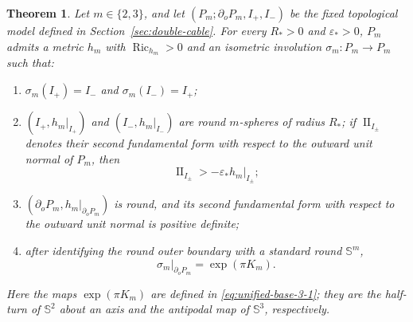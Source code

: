 \documentclass[11pt,reqno]{amsart}
\newtheorem{theorem}{Theorem}[section]
\theoremstyle{definition}
\numberwithin{equation}{section}
\DeclareMathOperator{\Ric}{Ric}
\DeclareMathOperator{\II}{II}
\begin{document}
\begin{theorem}
\label{thm:unified-directed-base}
Let $m\in\{2,3\}$, and let
$(P_m;\partial_oP_m,I_+,I_-)$ be the fixed topological model defined in
Section~\ref{sec:double-cable}.  For every $R_*>0$ and
$\varepsilon_*>0$, $P_m$ admits a metric $h_m$ with
$\Ric_{h_m}>0$ and an isometric
involution $\sigma_m:P_m\to P_m$ such that:
\begin{enumerate}[label=\textup{(\roman*)}]
\item $\sigma_m(I_+)=I_-$ and $\sigma_m(I_-)=I_+$;
\item $(I_+,h_m|_{I_+})$ and $(I_-,h_m|_{I_-})$ are round
$m$-spheres of radius $R_*$; if $\II_{I_\pm}$ denotes their second
fundamental form with respect to the outward unit normal of $P_m$, then
\begin{equation}
\II_{I_\pm}>-\varepsilon_*h_m|_{I_\pm};     \label{eq:unified-base-3-73}
\end{equation}
\item $(\partial_oP_m,h_m|_{\partial_oP_m})$ is round, and its second
fundamental form with respect to the outward unit normal is positive
definite;
\item after identifying the round outer boundary with a standard round
$\mathbb S^m$,
\begin{equation}
\sigma_m|_{\partial_oP_m}=\exp(\pi K_m).        \label{eq:unified-base-3-74}
\end{equation}
\end{enumerate}
Here the maps $\exp(\pi K_m)$ are defined in
\eqref{eq:unified-base-3-1}; they are the half-turn of $\mathbb S^2$
about an axis and the antipodal map of $\mathbb S^3$, respectively.
\end{theorem}
\end{document}
